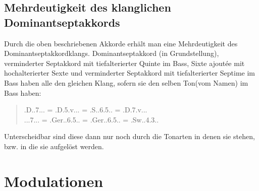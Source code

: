\documentclass[a4paper]{article}
\newcommand{\dShoch}[4]{\HH.\uppercase\expandafter{\romannumeral #1\relax}..#2.#3.#4.} %
\newcommand{\bel}[5]{\HH.#1.#5.#2.#3.#4.}
\newcommand{\Dhoch}[2]{\HH.D.#2.#1...}
\begin{document}
	\subsection{Mehrdeutigkeit des klanglichen Dominantseptakkords}
	Durch die oben beschriebenen Akkorde erhält man eine Mehrdeutigkeit des Dominantseptakkordklangs. Dominantseptakkord (in Grundstellung), verminderter Septakkord mit tiefalterierter Quinte im Bass, Sixte ajoutée mit hochalterierter Sexte und verminderter Septakkord mit tiefalterierter Septime im Bass haben alle den gleichen Klang, sofern sie den selben Ton(vom Namen) im Bass haben:
	\begin{quotation}
		\Dhoch{7}{} = \Dhoch{v}{5\VM} = \bel{S}{6\UB}{5}{}{} = \Dhoch{v}{7\VM}\\
		\dShoch{5}{7}{}{} = \bel{Ger}{6}{5}{}{} = \bel{Ger}{6}{5}{}{} = \bel{Sw}{4}{3}{}{}
	\end{quotation}
	Unterscheidbar sind diese dann nur noch durch die Tonarten in denen sie stehen, bzw. in die sie aufgelöst werden.
	
	\section{Modulationen}
\end{document}
